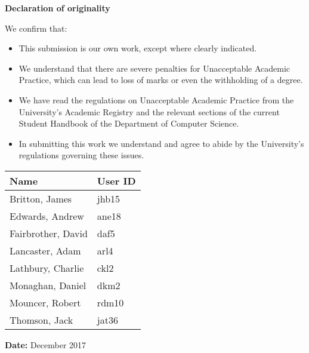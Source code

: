 \thispagestyle{empty}


\begin{center}
    {\LARGE\bf Declaration of originality}
\end{center}

We confirm that:

\begin{itemize}
\item{This submission is our own work, except where 
clearly indicated.}

\item{We understand that there are severe penalties for Unacceptable Academic Practice, which can lead to loss of marks or even the withholding of a degree.}
 
\item{We have read the regulations on Unacceptable Academic Practice from the University's Academic Registry and the relevant sections of the current Student Handbook of the Department of Computer Science.}
 
\item{In submitting this work we understand and agree to abide by the University's regulations governing these issues.}

\end{itemize}


\begin{tabular}{|l|l|}
\hline
\textbf{Name} & \textbf{User ID} \\
\hline  
  Britton, James  	 	&  jhb15 \\
  Edwards, Andrew  		&  ane18 \\
  Fairbrother, David    &  daf5  \\
  Lancaster, Adam 		&  arl4  \\
  Lathbury, Charlie		&  ckl2  \\
  Monaghan, Daniel		&  dkm2  \\
  Mouncer, Robert		&  rdm10 \\
  Thomson, Jack			&  jat36 \\
\hline       
\end{tabular}

\vspace{1em}
\textbf{Date:} December 2017 \\

